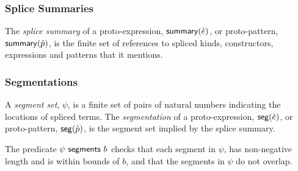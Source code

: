 \subsubsection{Splice Summaries}
The \emph{splice summary} of a proto-expression, $\mathsf{summary}(\grave{e})$, or proto-pattern, $\mathsf{summary}(\grave{p})$, is the finite set of references to spliced kinds, constructors, expressions and patterns that it mentions.

\subsubsection{Segmentations}
A \emph{segment set}, $\psi$, is a finite set of pairs of natural numbers indicating the locations of spliced terms. The \emph{segmentation} of a proto-expression, $\mathsf{seg}(\grave{e})$, or proto-pattern, $\mathsf{seg}(\grave{p})$, is the segment set implied by the splice summary.

The predicate $\psi~\mathsf{segments}~b$ checks that each segment in $\psi$, has non-negative length and is within bounds of $b$, and that the segments in $\psi$ do not overlap.


